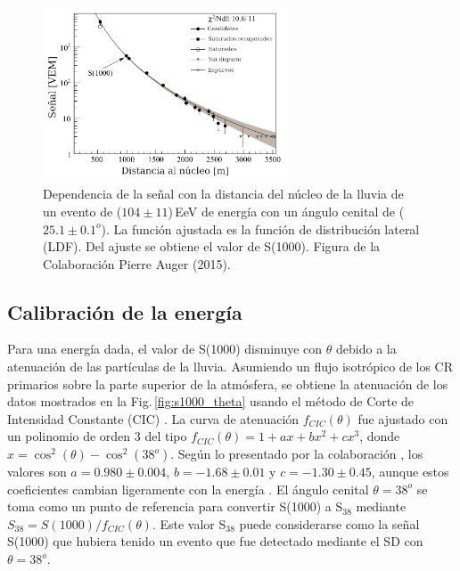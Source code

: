 \begin{figure}[H]
	\begin{small}
		\begin{center}
			\includegraphics[width=0.65\textwidth]{evento_s1000.png}
		\end{center}
		\caption{Dependencia de la señal con la distancia del núcleo de la lluvia de un evento de ($104\pm11$)\,EeV de energía con un ángulo cenital de ($25.1\pm0.1 ^o$). La función ajustada es la función de distribución lateral (LDF). Del ajuste se obtiene el valor de S(1000). Figura de la Colaboración Pierre Auger (2015). } 	\label{fig:evento_S1000}
	\end{small}
\end{figure}


\subsection{Calibración de la energía}

Para una energía dada, el valor de S(1000) disminuye con $\theta$ debido a la atenuación de las partículas de la lluvia. Asumiendo un flujo isotrópico de los CR primarios sobre la parte superior de la atmósfera, se obtiene la atenuación de los datos mostrados en la Fig.\,\ref{fig:s1000_theta}  usando el método de Corte de Intensidad Constante (CIC) \cite{CIC}. La curva de atenuación $f_{CIC}(\theta)$ fue ajustado con un polinomio de orden 3 del tipo $f_{CIC}(\theta)=1+ax+bx^2+cx^3$, donde $x=\cos^2(\theta) - \cos^2(38^o)$. Según lo presentado por la colaboración \cite{collaboration2013pierre}, los valores son $a=0.980\pm0.004$, $b=-1.68\pm0.01$ y $c=-1.30\pm 0.45$, aunque estos coeficientes cambian ligeramente con la energía \cite{data}. El ángulo cenital $\theta=38^o$ se toma como un punto de referencia para convertir S(1000) a S$_{38}$ mediante $S_{38}=S(1000)/f_{CIC}(\theta)$. Este valor S$_{38}$ puede considerarse como la señal S(1000) que hubiera tenido un evento que fue detectado mediante el SD con $\theta=38^o$.


